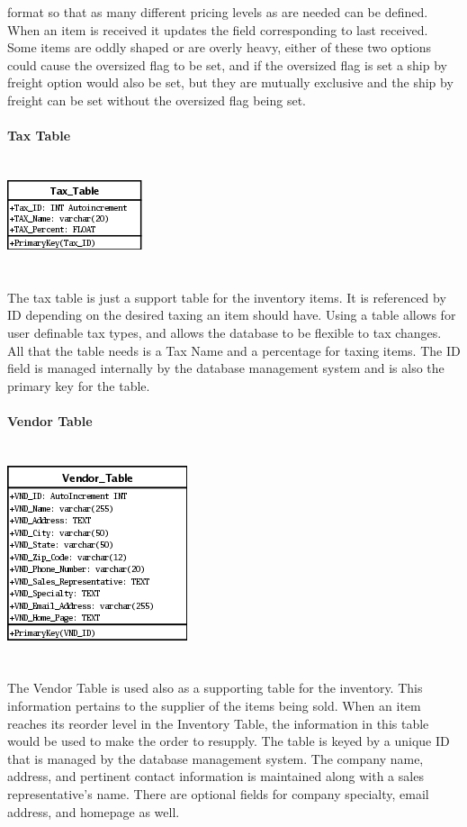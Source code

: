 \documentclass{report}
\begin{document}
	format so that as many different pricing levels as are needed can be defined. When an
	item is received it updates the field corresponding to last received. Some items are
	oddly shaped or are overly heavy, either of these two options could cause the oversized
	flag to be set, and if the oversized flag is set a ship by freight option would also be
	set, but they are mutually exclusive and the ship by freight can be set without the
	oversized flag being set.\\
	\\
	{\bf Tax Table}\\
	\\
	\\
	\includegraphics{Tables/TaxTable.png}\\
	\\
	\\
	The tax table is just a support table for the inventory items. It is referenced by ID
	depending on the desired taxing an item should have. Using a table allows for user definable
	tax types, and allows the database to be flexible to tax changes. All that the table needs
	is a Tax Name and a percentage for taxing items. The ID field is managed internally by the
	database management system and is also the primary key for the table.\\
	\\
	{\bf Vendor Table}\\
	\\
	\\
	\includegraphics{Tables/VendorTable.png}\\
	\\
	\\
	The Vendor Table is used also as a supporting table for the inventory. This information
	pertains to the supplier of the items being sold. When an item reaches its reorder level
	in the Inventory Table, the information in this table would be used to make the order to
	resupply. The table is keyed by a unique ID that is managed by the database management
	system. The company name, address, and pertinent contact information is maintained along
	with a sales representative's name. There are optional fields for company specialty, email
	address, and homepage as well.
\end{document}
